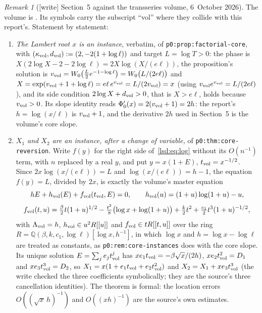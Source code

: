 \documentclass[11pt]{article}
\theoremstyle{remark}\newtheorem{remark}{Remark}
\newcommand{\file}[1]{\nolinkurl{#1}}
\begin{document}
\begin{remark}[{[write]} Section~5 against the transseries volume, 6~October 2026]\label{lsd:rem:transseries}
The volume is
.
Its symbols carry the subscript ``vol'' where they collide with this
report's. Statement by statement:
\begin{enumerate}
\item[(a)] \emph{The Lambert root $x$ is an instance}, verbatim, of
 \file{p0:prop:factorial-core}, with $(\kappa_{\rm vol},d_{\rm vol}):=(2,-2(1+\log\ell))$
 and target $L=\log T>0$: the phase is
 $X(2\log X-2-2\log\ell)=2X\log(X/(e\ell))$, the proposition's solution is
 $v_{\rm vol}=W_0\bigl(\tfrac L2e^{-1-\log\ell}\bigr)=W_0\bigl(L/(2e\ell)\bigr)$
 and $X=\exp(v_{\rm vol}+1+\log\ell)=e\ell\,e^{v_{\rm vol}}=L/(2v_{\rm vol})=x$
 (using $v_{\rm vol}e^{v_{\rm vol}}=L/(2e\ell)$), and its side condition
 $2\log X+d_{\rm vol}>0$, that is $X>e\ell$, holds because $v_{\rm vol}>0$.
 Its slope identity reads $\Phi_0'(x)=2(v_{\rm vol}+1)=2h$: the report's
 $h=\log(x/\ell)$ is $v_{\rm vol}+1$, and the derivative $2h$ used in Section~5
 is the volume's core slope.
\item[(b)] \emph{$X_1$ and $X_2$ are an instance, after a change of variable,}
 of \file{p0:thm:core-reversion}. Write $f(y)$ for the right side
 of~\eqref{lsd:eq:log} without its $O(n^{-1})$ term, with $n$ replaced by a
 real $y$, and put $y=x(1+E)$, $t_{\rm vol}=x^{-1/2}$. Since $2x\log(x/(e\ell))=L$
 and $\log(x/(e\ell))=h-1$, the equation $f(y)=L$, divided by $2x$, is exactly
 the volume's master equation
 \[
  hE+h_{\rm vol}(E)+f_{\rm vol}(t_{\rm vol},E)=0,\qquad
  h_{\rm vol}(u)=(1+u)\log(1+u)-u,
 \]
 \[
  f_{\rm vol}(t,u)=\tfrac\beta2t(1+u)^{1/2}-\tfrac{t^2}8\bigl(\log x+\log(1+u)\bigr)
  +\tfrac k2t^2+\tfrac{c_1}2t^3(1+u)^{-1/2},
 \]
 with $\Lambda_{\rm vol}=h$, $h_{\rm vol}\in u^2R[[u]]$ and
 $f_{\rm vol}\in tR[[t,u]]$ over the ring
 $R=\mathbb Q(\beta,k,c_1,\log\ell)[\log x,h^{-1}]$, in which $\log x$ and
 $h=\log x-\log\ell$ are treated as constants, as \file{p0:rem:core-instances}
 does with the core slope. Its unique solution $E=\sum_je_jt_{\rm vol}^j$ has
 $xe_1t_{\rm vol}=-\beta\sqrt x/(2h)$, $xe_2t_{\rm vol}^2=D_1$ and
 $xe_3t_{\rm vol}^3=D_2$, so $X_1=x(1+e_1t_{\rm vol}+e_2t_{\rm vol}^2)$ and
 $X_2=X_1+xe_3t_{\rm vol}^3$ (the write checked the three coefficients
 symbolically; they are the source's three cancellation identities). The
 theorem is formal: the location errors $O((\sqrt x\,h)^{-1})$ and
 $O((xh)^{-1})$ are the source's own estimates.

\end{enumerate}
\end{remark}
\end{document}
